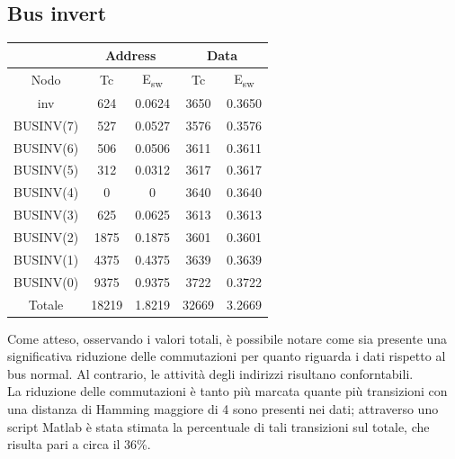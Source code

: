 \documentclass[11pt,  english, makeidx, a4paper, titlepage, oneside]{book}
\begin{document}
\subsection{Bus invert}
\begin{center}
	\begin{tabular}{|c|c|c||c|c|}
	\hline
	& \multicolumn{2}{c}{Address} & \multicolumn{2}{c}{Data}\\
	\hline
	Nodo & Tc & E\textsubscript{sw} & Tc & E\textsubscript{sw} \\
	\hline
	inv & 624 & 0.0624 & 3650 & 0.3650\\
	\hline
	BUSINV(7) & 527 & 0.0527 & 3576 & 0.3576\\
	 \hline
	BUSINV(6) & 506 & 0.0506 & 3611 & 0.3611\\
	\hline
	BUSINV(5) & 312 & 0.0312 & 3617 & 0.3617\\
	\hline
	BUSINV(4) & 0 & 0 & 3640 & 0.3640\\
	\hline
	BUSINV(3) & 625 & 0.0625 & 3613 & 0.3613\\
	\hline
	BUSINV(2) & 1875 & 0.1875 & 3601 & 0.3601\\
	\hline
	BUSINV(1) & 4375 & 0.4375 & 3639 & 0.3639\\
	\hline
	BUSINV(0) & 9375 & 0.9375 & 3722 & 0.3722\\
	\hline
	Totale & 18219 & 1.8219 & 32669 & 3.2669\\
	\hline
	\end{tabular}	
\end{center}
\vspace{0.3cm}
Come atteso, osservando i valori totali, è possibile notare come sia presente una significativa riduzione delle commutazioni per quanto riguarda i dati rispetto al bus normal. Al contrario, le attività degli indirizzi risultano conforntabili.
\\
La riduzione delle commutazioni è tanto più marcata quante più transizioni con una distanza di Hamming maggiore di 4 sono presenti nei dati; attraverso uno script Matlab è stata stimata la percentuale di tali transizioni sul totale, che risulta pari a circa il 36\%.
\end{document}
